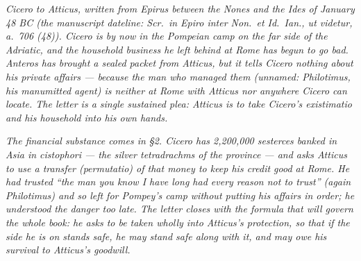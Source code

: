 
\textit{Cicero to Atticus, written from Epirus between the
Nones and the Ides of January 48 BC (the manuscript dateline:
\textit{Scr.\ in Epiro inter Non.\ et Id.\ Ian., ut videtur,
a.\ 706 (48)}). Cicero is by now in the Pompeian camp on the
far side of the Adriatic, and the household business he left
behind at Rome has begun to go bad. Anteros has brought a
sealed packet from Atticus, but it tells Cicero nothing about
his private affairs --- because the man who managed them
(unnamed: Philotimus, his manumitted agent) is neither at
Rome with Atticus nor anywhere Cicero can locate. The letter
is a single sustained plea: Atticus is to take Cicero's
\textit{existimatio} and his household into his own hands.}

\textit{The financial substance comes in \S2. Cicero has
2{,}200{,}000 sesterces banked in Asia in cistophori --- the
silver tetradrachms of the province --- and asks Atticus to
use a transfer (\textit{permutatio}) of that money to keep
his credit good at Rome. He had trusted ``the man you know
I have long had every reason not to trust'' (again
Philotimus) and so left for Pompey's camp without putting
his affairs in order; he understood the danger too late.
The letter closes with the formula that will govern the
whole book: he asks to be taken wholly into Atticus's
protection, so that if the side he is on stands safe, he
may stand safe along with it, and may owe his survival to
Atticus's goodwill.}
